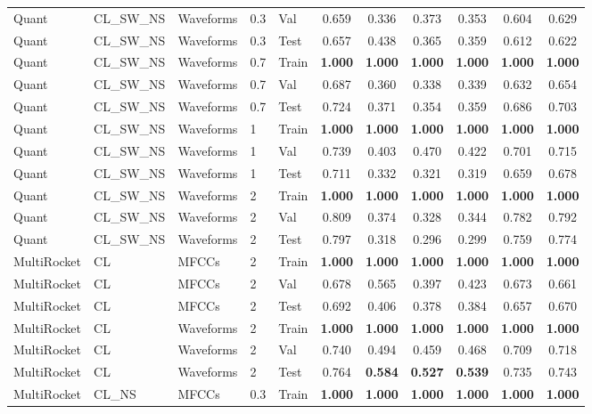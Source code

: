 \begin{landscape}
\begin{longtable}{|l|l|l|l|l|c|c|c|c|c|c|}
Quant & CL\_SW\_NS & Waveforms & 0.3 & Val & 0.659 & 0.336 & 0.373 & 0.353 & 0.604 & 0.629 \\
Quant & CL\_SW\_NS & Waveforms & 0.3 & Test & 0.657 & 0.438 & 0.365 & 0.359 & 0.612 & 0.622 \\
Quant & CL\_SW\_NS & Waveforms & 0.7 & Train & \textbf{1.000} & \textbf{1.000} & \textbf{1.000} & \textbf{1.000} & \textbf{1.000} & \textbf{1.000} \\
Quant & CL\_SW\_NS & Waveforms & 0.7 & Val & 0.687 & 0.360 & 0.338 & 0.339 & 0.632 & 0.654 \\
Quant & CL\_SW\_NS & Waveforms & 0.7 & Test & 0.724 & 0.371 & 0.354 & 0.359 & 0.686 & 0.703 \\
Quant & CL\_SW\_NS & Waveforms & 1 & Train & \textbf{1.000} & \textbf{1.000} & \textbf{1.000} & \textbf{1.000} & \textbf{1.000} & \textbf{1.000} \\
Quant & CL\_SW\_NS & Waveforms & 1 & Val & 0.739 & 0.403 & 0.470 & 0.422 & 0.701 & 0.715 \\
Quant & CL\_SW\_NS & Waveforms & 1 & Test & 0.711 & 0.332 & 0.321 & 0.319 & 0.659 & 0.678 \\
Quant & CL\_SW\_NS & Waveforms & 2 & Train & \textbf{1.000} & \textbf{1.000} & \textbf{1.000} & \textbf{1.000} & \textbf{1.000} & \textbf{1.000} \\
Quant & CL\_SW\_NS & Waveforms & 2 & Val & 0.809 & 0.374 & 0.328 & 0.344 & 0.782 & 0.792 \\
Quant & CL\_SW\_NS & Waveforms & 2 & Test & 0.797 & 0.318 & 0.296 & 0.299 & 0.759 & 0.774 \\
MultiRocket & CL & MFCCs & 2 & Train & \textbf{1.000} & \textbf{1.000} & \textbf{1.000} & \textbf{1.000} & \textbf{1.000} & \textbf{1.000} \\
MultiRocket & CL & MFCCs & 2 & Val & 0.678 & 0.565 & 0.397 & 0.423 & 0.673 & 0.661 \\
MultiRocket & CL & MFCCs & 2 & Test & 0.692 & 0.406 & 0.378 & 0.384 & 0.657 & 0.670 \\
MultiRocket & CL & Waveforms & 2 & Train & \textbf{1.000} & \textbf{1.000} & \textbf{1.000} & \textbf{1.000} & \textbf{1.000} & \textbf{1.000} \\
MultiRocket & CL & Waveforms & 2 & Val & 0.740 & 0.494 & 0.459 & 0.468 & 0.709 & 0.718 \\
MultiRocket & CL & Waveforms & 2 & Test & 0.764 & \textbf{0.584} & \textbf{0.527} & \textbf{0.539} & 0.735 & 0.743 \\
MultiRocket & CL\_NS & MFCCs & 0.3 & Train & \textbf{1.000} & \textbf{1.000} & \textbf{1.000} & \textbf{1.000} & \textbf{1.000} & \textbf{1.000} \\

\end{longtable}
\end{landscape}

